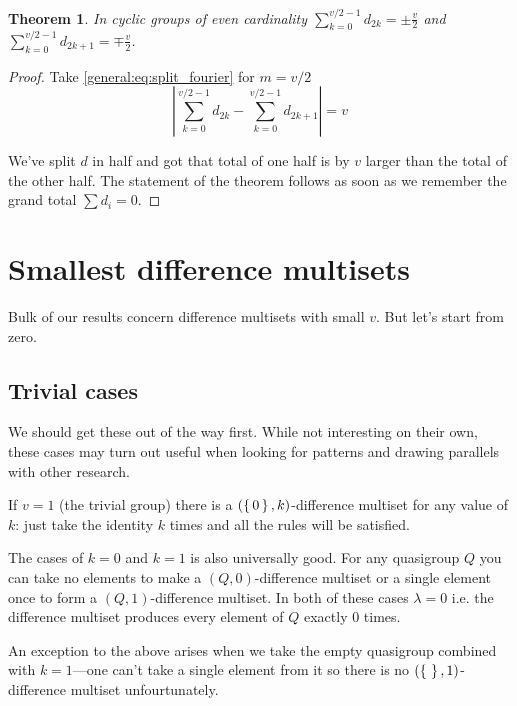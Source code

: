 \documentclass{article}
\theoremstyle{plain}
\newtheorem{theorem}{Theorem}[section]
\theoremstyle{definition}
\theoremstyle{remark}
\begin{document}
                \begin{theorem}
                    \label{general:theorem:even_cyclic}
                    In cyclic groups of even cardinality $\sum_{k=0}^{v/2-1} d_{2k} = \pm \frac v2$ and $\sum_{k=0}^{v/2-1} d_{2k+1} = \mp \frac v2$.
                \end{theorem}
                \begin{proof}
                    Take \eqref{general:eq:split_fourier} for $m=v/2$
                    \begin{equation}
                        \left| \sum_{k=0}^{v/2-1} d_{2k} - \sum_{k=0}^{v/2-1} d_{2k+1} \right| = v
                    \end{equation}
                    
                    We've split $d$ in half and got that total of one half is by $v$ larger than the total of the other half. The statement of the theorem follows as soon as we remember the grand total $\sum d_i = 0$.
                \end{proof}
            
	\section{Smallest difference multisets}
        Bulk of our results concern difference multisets with small $v$. But let's start from zero.
	
		\subsection{Trivial cases}
			We should get these out of the way first. While not interesting on their own, these cases may turn out useful when looking for patterns and drawing parallels with other research.
			
			If $v=1$ (the trivial group) there is a $(\set{0},k)$-difference multiset for any value of $k$: just take the identity $k$ times and all the rules will be satisfied.
			
			The cases of $k=0$ and $k=1$ is also universally good. For any quasigroup $Q$ you can take no elements to make a $(Q,0)$-difference multiset or a single element once to form a $(Q,1)$-difference multiset. In both of these cases $\lambda=0$ i.e. the difference multiset produces every element of $Q$ exactly $0$ times.
			
			An exception to the above arises when we take the empty quasigroup combined with $k=1$---one can't take a single element from it so there is no $(\set{}, 1)$-difference multiset unfourtunately.
			
\end{document}
